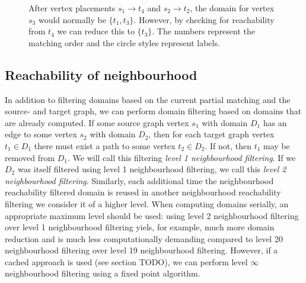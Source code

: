 \begin{figure}
\centering
\parbox{1.2in}{

}
\qquad\qquad
\begin{minipage}{1.2in}%

\end{minipage}
\caption{After vertex placements $s_1 \to t_4$ and $s_2 \to t_2$, the domain for vertex $s_3$ would normally be $\{t_1, t_3\}$. However, by checking for reachability from $t_4$ we can reduce this to $\{t_3\}$. The numbers represent the matching order and the circle styles represent labels.}
\label{fig:reachability-filtered}
\end{figure}
\subsection{Reachability of neighbourhood}
In addition to filtering domains based on the current partial matching and the source- and target graph, we can perform domain filtering based on domains that are already computed. If some source graph vertex $s_1$ with domain $D_1$ has an edge to some vertex $s_2$ with domain $D_2$, then for each target graph vertex $t_1 \in D_1$ there must exist a path to some vertex $t_2 \in D_2$. If not, then $t_1$ may be removed from $D_1$. We will call this filtering \textit{level 1 neighbourhood filtering}. If we $D_2$ was itself filtered using level 1 neighbourhood filtering, we call this \textit{level 2 neighbourhood filtering}. Similarly, each additional time the neighbourhood reachability filtered domain is reused in another neighbourhood reachability filtering we consider it of a higher level. When computing domains serially, an appropriate maximum level should be used: using level 2 neighbourhood filtering over level 1 neighbourhood filtering yiels, for example, much more domain reduction and is much less computationally demanding compared to level 20 neighbourhood filtering over level 19 neighbourhood filtering. However, if a cached approach is used (see section TODO), we can perform level $\infty$ neighbourhood filtering using a fixed point algorithm.

